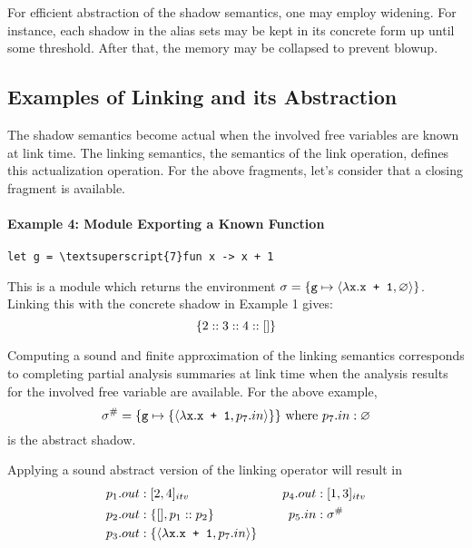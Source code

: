 \documentclass{article}
\begin{document}
For efficient abstraction of the shadow semantics, one may employ widening.
For instance, each shadow in the alias sets may be kept in its concrete form
up until some threshold. After that, the memory may be collapsed to prevent blowup.

\subsection{Examples of Linking and its Abstraction}
The shadow semantics become actual when the involved free variables
are known at link time. The linking semantics, the semantics of the link
operation, defines this actualization operation. For the above fragments, let's
consider that a closing fragment is available.

\paragraph{Example 4: Module Exporting a Known Function}
\begin{center}
  \begin{BVerbatim}[commandchars=\\\{\}]
let g = \textsuperscript{7}fun x -> x + 1
  \end{BVerbatim}
\end{center}
This is a module which returns the environment
$\sigma=\{\texttt{g}\mapsto\langle\lambda\texttt{x}.\texttt{x + 1},\varnothing\rangle\}$.
Linking this with the concrete shadow in Example 1 gives:
\[\{2::3::4::[]\}\]

Computing a sound and finite approximation of the linking semantics
corresponds to completing partial analysis summaries at link time when
the analysis results for the involved free variable are available. For
the above example,
\[
  {\sigma}^{\#}=\{\texttt{g}\mapsto\{\langle\lambda\texttt{x}.\texttt{x + 1},p_7.{in}\rangle\}\}\text{ where }
  p_7.{in}:\varnothing
\]
is the abstract shadow.

Applying a sound abstract version of the linking operator will result in
\begin{align*}
  p_1.{out} & :[2,4]_{{itv}}                                                     &  &  & p_4.{out} & :[1,3]_{{itv}} \\
  p_2.{out} & :\{[],p_1:: p_2\}                                            &  &  & p_5.{in}  & :{\sigma}^{\#}               \\
  p_3.{out} & :\{\langle\lambda\texttt{x}.\texttt{x + 1},p_7.{in}\rangle\} &  &  &
\end{align*}
\end{document}
